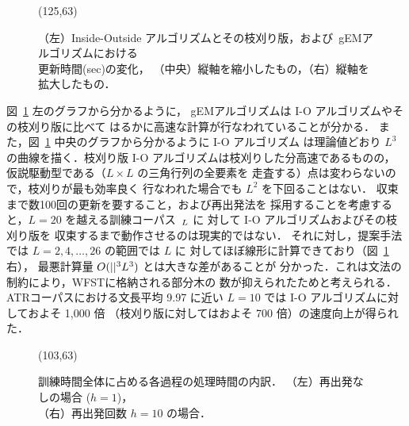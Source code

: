 {\begin{figure}[t]
\atari(125,63)
\caption{（左）Inside-Outside アルゴリズムとその枝刈り版，および\
	gEMアルゴリズムにおける\\更新時間(sec)の変化，
	（中央）縦軸を縮小したもの，（右）縦軸を拡大したもの．}
\label{graph:1}
\end{figure}

図~\ref{graph:1} 左のグラフから分かるように，
gEMアルゴリズムは I-O
アルゴリズムやその枝刈り版に比べて
はるかに高速な計算が行なわれていることが分かる．
また，図~\ref{graph:1} 中央のグラフから分かるように I-O アルゴリズム
は理論値どおり $L^3$ の曲線を描く．枝刈り版 I-O
アルゴリズムは枝刈りした分高速であるものの，
仮説駆動型である（$L\times L$ の三角行列の全要素を
走査する）点は変わらないので，枝刈りが最も効率良く
行なわれた場合でも $L^2$ を下回ることはない．
収束まで数100回の更新を要すること，および再出発法を
採用することを考慮すると，$L=20$ を越える訓練コーパス\
$_L$ に 対して I-O アルゴリズムおよびその枝刈り版を
収束するまで動作させるのは現実的ではない．
それに対し，提案手法では $L=2,4,\ldots, 26$ の範囲では $L$ に
対してほぼ線形に計算できており（図~\ref{graph:1} 右），
最悪計算量 $O(||^3 L^3)$ とは大きな差があることが
分かった．これは文法の制約により，WFSTに格納される部分木の
数が抑えられたためと考えられる．ATRコーパスにおける文長平均 9.97
に近い $L=10$ では I-O アルゴリズムに対しておよそ 1,000 倍
（枝刈り版に対してはおよそ 700 倍）の速度向上が得られた．

\begin{figure}[t]
\atari(103,63)
\caption{訓練時間全体に占める各過程の処理時間の内訳．
	（左）再出発なしの場合 ($h=1$)，\\
	（右）再出発回数 $h=10$ の場合．}
\label{graph:2}
\end{figure}

}
